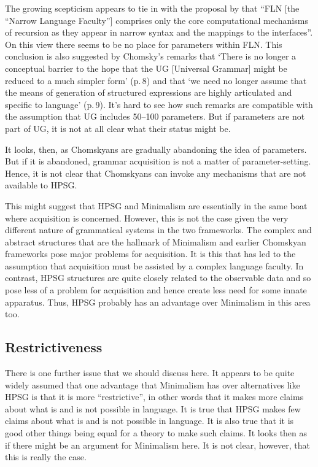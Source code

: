 \documentclass[output=paper]{langsci/langscibook}
\begin{document}
The growing scepticism appears to tie in with the proposal by \citet*[]{HCF2002a}
that ``FLN [the ``Narrow Language Faculty''] comprises only the core computational mechanisms of
recursion as they appear in narrow syntax and the mappings to the interfaces''. On this view there
seems to be no place for parameters within FLN. This conclusion is also suggested by Chomsky’s
remarks \citeyearpar{Chomsky2005a} that ‘There is no longer a conceptual barrier to the hope that the UG [Universal
  Grammar] might be reduced to a much simpler form’ (p.\,8) and that ‘we need no longer assume that
the means of generation of structured expressions are highly articulated and specific to language’
(p.\,9). It’s hard to see how such remarks are compatible with the assumption that UG includes 50--100
parameters. But if parameters are not part of UG, it is not at all clear what their status might be.

It looks, then, as Chomskyans are gradually abandoning the idea of parameters. But if it is
abandoned, grammar acquisition is not a matter of parameter-setting. Hence, it is not clear that
Chomskyans can invoke any mechanisms that are not available to HPSG.

This might suggest that HPSG and Minimalism are essentially in the same boat where acquisition is
concerned. However, this is not the case given the very different nature of grammatical systems in
the two frameworks. The complex and abstract structures that are the hallmark of Minimalism and
earlier Chomskyan frameworks pose major problems for acquisition. It is this that has led to the
assumption that acquisition must be assisted by a complex language faculty. In contrast, HPSG
structures are quite closely related to the observable data and so pose less of a problem for
acquisition and hence create less need for some innate apparatus. Thus, HPSG probably has an
advantage over Minimalism in this area too.

\subsection{Restrictiveness}

There is one further issue that we should discuss here. It appears to be quite widely assumed that
one advantage that Minimalism has over alternatives like HPSG is that it is more ``restrictive'', in
other words that it makes more claims about what is and is not possible in language. It is true that
HPSG makes few claims about what is and is not possible in language. It is also true that it is good
other things being equal for a theory to make such claims. It looks then as if there might be an
argument for Minimalism here. It is not clear, however, that this is really the case.
\end{document}
